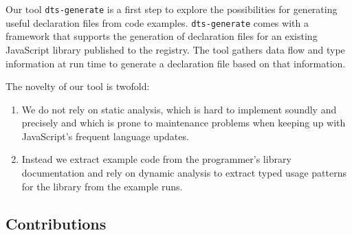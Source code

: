 \documentclass[english,cleveref,autoref,submission]{programming}
\begin{document}
Our tool \texttt{dts-generate} is a first step to explore the possibilities for
generating useful declaration files from code
examples. \texttt{dts-generate} comes with a framework that 
supports the generation of declaration files for an existing
JavaScript library published to the \NPM{} registry. The tool gathers
data flow and type information at run time to generate a declaration
file based on that information.

The novelty of our tool is twofold:
\begin{enumerate}
\item
  We do not rely on static analysis, which is hard to implement
  soundly and precisely and which is prone to maintenance problems
  when keeping up with JavaScript's frequent language updates.
\item
  Instead we extract example code from the programmer's library
  documentation and rely on dynamic analysis to extract typed usage
  patterns for the library from the example runs.
\end{enumerate}


\subsection{Contributions}
\label{sec:contributions}
\end{document}
